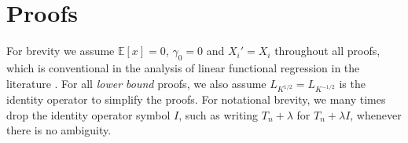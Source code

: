 \documentclass[11pt,a4paper]{article}
\theoremstyle{definition}
\theoremstyle{plain}
\theoremstyle{remark}
\begin{document}




\clearpage
\section{Proofs}

For brevity we assume $\mathbb E[x]=0$, $\gamma_0=0$ and $X_i'=X_i$ throughout all proofs, which is conventional in the analysis of linear functional regression in the literature \citep{cai2012minimax,yuan2010reproducing}.
For all \emph{lower bound} proofs, we also assume $L_{K^{1/2}}=L_{K^{-1/2}}$ is the identity operator to simplify the proofs.
For notational brevity, we many times drop the identity operator symbol $I$, such as writing $T_n+\lambda$ for $T_n+\lambda I$, whenever there is no ambiguity.
\end{document}
